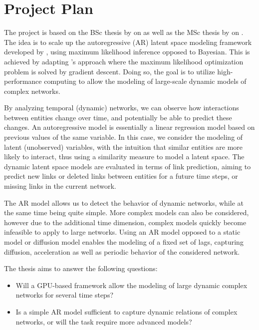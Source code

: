 \documentclass[]{article}
\begin{document}
\section*{Project Plan}

The project is based on the BSc thesis by \citeauthor{zangenberg2018a} \cite{zangenberg2018a} on  as well as the MSc thesis by \citeauthor{jacobsen2018a} \cite{jacobsen2018a} on . The idea is to scale up the autoregressive (AR) latent space modeling framework developed by \citeauthor{zangenberg2018a}, using maximum likelihood inference opposed to Bayesian. This is achieved by adapting \citeauthor{jacobsen2018a}'s approach where the maximum likelihood optimization problem is solved by gradient descent. Doing so, the goal is to utilize high-performance computing to allow the modeling of large-scale dynamic models of complex networks.

By analyzing temporal (dynamic) networks, we can observe how interactions between entities change over time, and potentially be able to predict these changes. An autoregressive model is essentially a linear regression model based on previous values of the same variable. In this case, we consider the modeling of latent (unobserved) variables, with the intuition that similar entities are more likely to interact, thus using a similarity measure to model a latent space.
The dynamic latent space models are evaluated in terms of link prediction, aiming to predict new links or deleted links between entities for a future time steps, or missing links in the current network.

The AR model allows us to detect the behavior of dynamic networks, while at the same time being quite simple. More complex models can also be considered, however due to the additional time dimension, complex models quickly become infeasible to apply to large networks. Using an AR model opposed to a static model or diffusion model enables the modeling of a fixed set of lags, capturing diffusion, acceleration as well as periodic behavior of the considered network.

The thesis aims to answer the following questions:
\begin{itemize}\itshape
    \item Will a GPU-based framework allow the modeling of large dynamic complex networks for several time steps?
    \item Is a simple AR model sufficient to capture dynamic relations of complex networks, or will the task require more advanced models?
\end{itemize}
\end{document}
